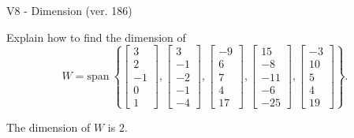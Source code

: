 \begin{exercise}
  \begin{exerciseTitle}V8 - Dimension (ver. 186)\end{exerciseTitle}
  \begin{exerciseStatement}
    Explain how to find the dimension of 
\[W=\mathrm{span}\ \left\{\left[\begin{array}{r}
3 \\
2 \\
-1 \\
0 \\
1
\end{array}\right] , \left[\begin{array}{r}
3 \\
-1 \\
-2 \\
-1 \\
-4
\end{array}\right] , \left[\begin{array}{r}
-9 \\
6 \\
7 \\
4 \\
17
\end{array}\right] , \left[\begin{array}{r}
15 \\
-8 \\
-11 \\
-6 \\
-25
\end{array}\right] , \left[\begin{array}{r}
-3 \\
10 \\
5 \\
4 \\
19
\end{array}\right]\right\}.\]



  \end{exerciseStatement}
  \begin{exerciseAnswer}
   The dimension of \(W\) is  \(2\).
  


  \end{exerciseAnswer}
\end{exercise}